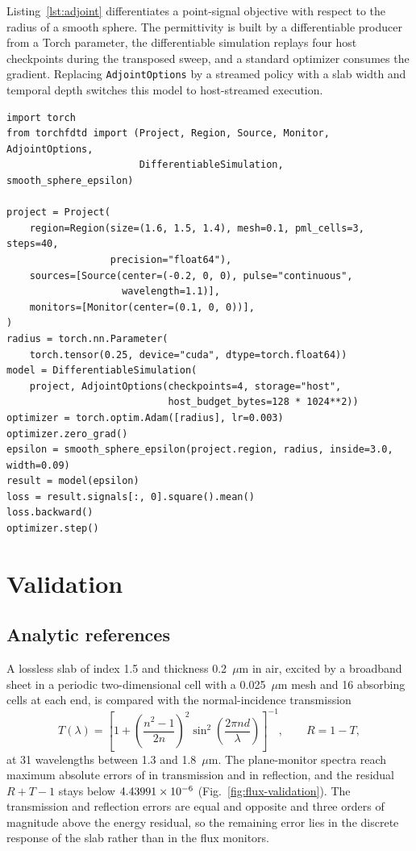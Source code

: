 \documentclass[preprint,11pt]{elsarticle}
\newcommand{\code}[1]{{\small\nolinkurl{#1}}}
\newcommand{\micron}{\ensuremath{\mu\mathrm{m}}}
\begin{document}
Listing~\ref{lst:adjoint} differentiates a point-signal objective with respect to the radius of a smooth sphere. The permittivity is built by a differentiable producer from a Torch parameter, the differentiable simulation replays four host checkpoints during the transposed sweep, and a standard optimizer consumes the gradient. Replacing \code{AdjointOptions} by a streamed policy with a slab width and temporal depth switches this model to host-streamed execution.
\begin{lstlisting}[float=tbp,caption={A differentiable simulation with checkpoint replay.},label={lst:adjoint}]
import torch
from torchfdtd import (Project, Region, Source, Monitor, AdjointOptions,
                       DifferentiableSimulation, smooth_sphere_epsilon)

project = Project(
    region=Region(size=(1.6, 1.5, 1.4), mesh=0.1, pml_cells=3, steps=40,
                  precision="float64"),
    sources=[Source(center=(-0.2, 0, 0), pulse="continuous",
                    wavelength=1.1)],
    monitors=[Monitor(center=(0.1, 0, 0))],
)
radius = torch.nn.Parameter(
    torch.tensor(0.25, device="cuda", dtype=torch.float64))
model = DifferentiableSimulation(
    project, AdjointOptions(checkpoints=4, storage="host",
                            host_budget_bytes=128 * 1024**2))
optimizer = torch.optim.Adam([radius], lr=0.003)
optimizer.zero_grad()
epsilon = smooth_sphere_epsilon(project.region, radius, inside=3.0, width=0.09)
result = model(epsilon)
loss = result.signals[:, 0].square().mean()
loss.backward()
optimizer.step()
\end{lstlisting}

\section{Validation}
\label{sec:validation}

\subsection{Analytic references}

A lossless slab of index 1.5 and thickness 0.2~\micron{} in air, excited by a broadband sheet in a periodic two-dimensional cell with a 0.025~\micron{} mesh and 16 absorbing cells at each end, is compared with the normal-incidence transmission
\begin{equation}
T(\lambda)=\left[1+\left(\frac{n^{2}-1}{2n}\right)^{2}\sin^{2}\!\left(\frac{2\pi nd}{\lambda}\right)\right]^{-1},\qquad R=1-T,
\label{eq:slab}
\end{equation}
at 31 wavelengths between 1.3 and 1.8~\micron{}. The plane-monitor spectra reach maximum absolute errors of \SlabTError{} in transmission and \SlabRError{} in reflection, and the residual $R+T-1$ stays below $4.43991\times10^{-6}$ (Fig.~\ref{fig:flux-validation}). The transmission and reflection errors are equal and opposite and three orders of magnitude above the energy residual, so the remaining error lies in the discrete response of the slab rather than in the flux monitors.
\end{document}
